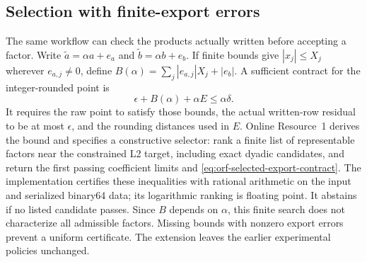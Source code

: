 \subsection{Selection with finite-export errors}
The same workflow can check the products actually written before accepting a
factor. Write $\widetilde a=\alpha a+e_a$ and
$\widetilde b=\alpha b+e_b$. If finite bounds give $|x_j|\le X_j$ wherever
$e_{a,j}\ne0$, define $B(\alpha)=\sum_j|e_{a,j}|X_j+|e_b|$.
A sufficient contract for the integer-rounded point is
\begin{equation}\label{eq:orf-selected-export-contract}
 \epsilon+B(\alpha)+\alpha E\le\alpha\delta.
\end{equation}
It requires the raw point to satisfy those bounds, the actual written-row
residual to be at most $\epsilon$, and the rounding distances used in $E$.
Online Resource~1 derives the bound and specifies a constructive selector:
rank a finite list of representable factors near the constrained L2 target,
including exact dyadic candidates, and return the first passing coefficient
limits and \eqref{eq:orf-selected-export-contract}. The implementation certifies
these inequalities with rational arithmetic on the input and serialized
binary64 data; its logarithmic ranking is floating point. It abstains if no
listed candidate passes. Since $B$ depends on $\alpha$, this finite search does
not characterize all admissible factors. Missing bounds with nonzero export
errors prevent a uniform certificate. The extension leaves the earlier
experimental policies unchanged.
